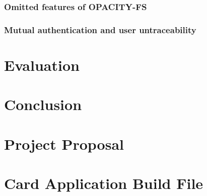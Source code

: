 \documentclass[12pt,a4paper,twoside,openright]{report}
\begin{document}
\subsection{Omitted features of OPACITY-FS}
\label{opacityomissions}

\subsection{Mutual authentication and user untraceability}

\blindtext

\chapter{Evaluation}



\chapter{Conclusion}




\appendix

\chapter{Project Proposal}
\label{appendix:proposal}



\chapter{Card Application Build File}
\label{appendix:cardappbuildfile}
\end{document}
